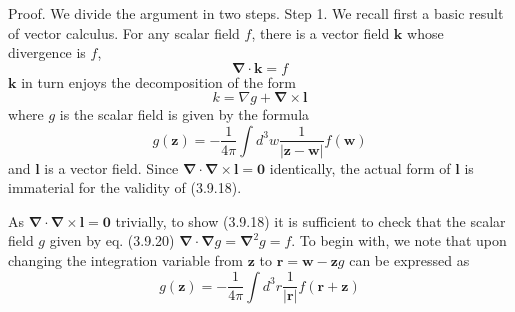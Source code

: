 \documentclass{article}
\begin{document}
Proof. We divide the argument in two steps.
Step 1. We recall first a basic result of vector calculus. For any scalar field $f$, there is a vector field $\boldsymbol{k}$ whose divergence is $f$,
$$
\begin{equation*}
\boldsymbol{\nabla} \cdot \boldsymbol{k}=f \tag{3.9.18}
\end{equation*}
$$
$\boldsymbol{k}$ in turn enjoys the decomposition of the form
$$
\begin{equation*}
k=\nabla g+\boldsymbol{\nabla} \times \boldsymbol{l} \tag{3.9.19}
\end{equation*}
$$
where $g$ is the scalar field is given by the formula
$$
\begin{equation*}
g(\boldsymbol{z})=-\frac{1}{4 \pi} \int d^{3} w \frac{1}{|\boldsymbol{z}-\boldsymbol{w}|} f(\boldsymbol{w}) \tag{3.9.20}
\end{equation*}
$$
and $\boldsymbol{l}$ is a vector field. Since $\boldsymbol{\nabla} \cdot \boldsymbol{\nabla} \times \boldsymbol{l}=\mathbf{0}$ identically, the actual form of $\boldsymbol{l}$ is immaterial for the validity of (3.9.18).

As $\boldsymbol{\nabla} \cdot \boldsymbol{\nabla} \times \boldsymbol{l}=\mathbf{0}$ trivially, to show (3.9.18) it is sufficient to check that the scalar field $g$ given by eq. (3.9.20) $\boldsymbol{\nabla} \cdot \boldsymbol{\nabla} g=\boldsymbol{\nabla}^{2} g=f$. To begin with, we note that upon changing the integration variable from $\boldsymbol{z}$ to $\boldsymbol{r}=\boldsymbol{w}-\boldsymbol{z} g$ can be expressed as
$$
\begin{equation*}
g(\boldsymbol{z})=-\frac{1}{4 \pi} \int d^{3} r \frac{1}{|\boldsymbol{r}|} f(\boldsymbol{r}+\boldsymbol{z}) \tag{3.9.21}
\end{equation*}
$$
\end{document}
